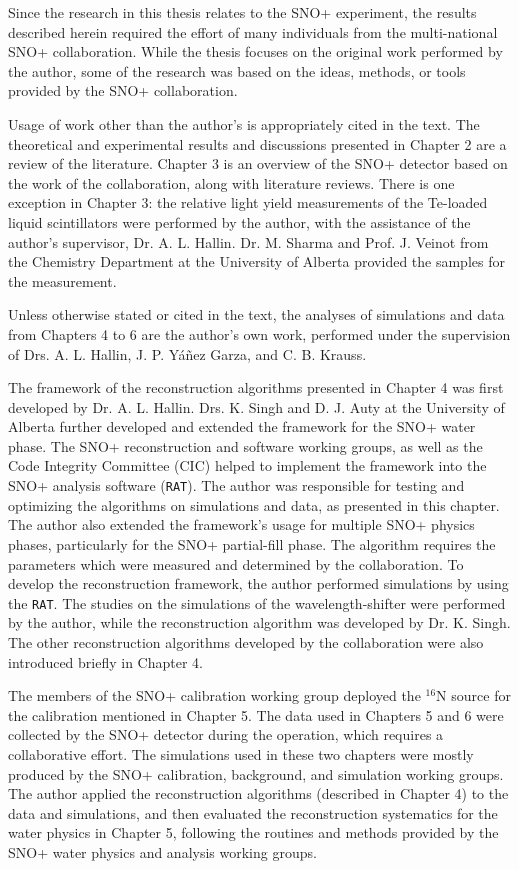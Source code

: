 Since the research in this thesis relates to the SNO+ experiment, the results described herein required the effort of many individuals from the multi-national SNO+ collaboration. While the thesis focuses on the original work performed by the author, some of the research was based on the ideas, methods, or tools provided by the SNO+ collaboration.

Usage of work other than the author's is appropriately cited in the text. The theoretical and experimental results and discussions presented in Chapter 2 are a review of the literature. Chapter 3 is an overview of the SNO+ detector based on the work of the collaboration, along with literature reviews. There is one exception in Chapter 3: the relative light yield measurements of the Te-loaded liquid scintillators were performed by the author, with the assistance of the author's supervisor, Dr. A. L. Hallin. Dr. M. Sharma and Prof. J. Veinot from the Chemistry Department at the University of Alberta provided the samples for the measurement.

Unless otherwise stated or cited in the text, the analyses of simulations and data from Chapters 4 to 6 are the author's own work, performed under the supervision of Drs. A. L. Hallin, J. P. Y\'{a}\~{n}ez Garza, and C. B. Krauss.

The framework of the reconstruction algorithms presented in Chapter 4 was first developed by Dr. A. L. Hallin. Drs. K. Singh and D. J. Auty at the University of Alberta further developed and extended the framework for the SNO+ water phase. The SNO+ reconstruction and software working groups, as well as the Code Integrity Committee (CIC) helped to implement the framework into the SNO+ analysis software (\texttt{RAT}). The author was responsible for testing and optimizing the algorithms on simulations and data, as presented in this chapter. The author also extended the framework's usage for multiple SNO+ physics phases, particularly for the SNO+ partial-fill phase. The algorithm requires the parameters which were measured and determined by the collaboration. To develop the reconstruction framework, the author performed simulations by using the \texttt{RAT}. The studies on the simulations of the wavelength-shifter were performed by the author, while the reconstruction algorithm was developed by Dr. K. Singh. The other reconstruction algorithms developed by the collaboration were also introduced briefly in Chapter 4.

The members of the SNO+ calibration working group deployed the $^{16}$N source for the calibration mentioned in Chapter 5. The data used in Chapters 5 and 6 were collected by the SNO+ detector during the operation, which requires a collaborative effort. The simulations used in these two chapters were mostly produced by the SNO+ calibration, background, and simulation working groups. The author applied the reconstruction algorithms (described in Chapter 4) to the data and simulations, and then evaluated the reconstruction systematics for the water physics in Chapter 5, following the routines and methods provided by the SNO+ water physics and analysis working groups.

